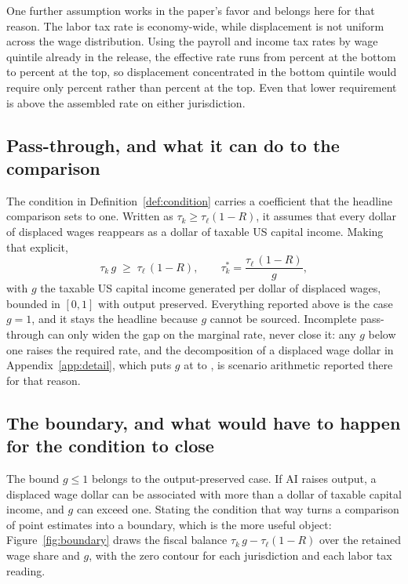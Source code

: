 One further assumption works in the paper's favor and belongs here for that reason. The labor
tax rate is economy-wide, while displacement is not uniform across the wage distribution. Using
the payroll and income tax rates by wage quintile already in the release, the effective rate runs
from  percent at the bottom to  percent
at the top, so displacement concentrated in the bottom quintile would require only
 percent rather than  percent at the
top. Even that lower requirement is above the assembled rate on either jurisdiction.

\subsection{Pass-through, and what it can do to the comparison}

The condition in Definition~\ref{def:condition} carries a coefficient that the headline comparison
sets to one. Written as $\tau_k \ge \tau_\ell (1 - R)$, it assumes that every dollar of displaced
wages reappears as a dollar of taxable US capital income. Making that explicit,
\begin{equation}
\tau_k \, g \;\ge\; \tau_\ell\,(1 - R), \qquad
\tau_k^{\ast} = \frac{\tau_\ell\,(1 - R)}{g},
\label{eq:passthrough}
\end{equation}
with $g$ the taxable US capital income generated per dollar of displaced wages, bounded in
$[0,1]$ with output preserved. Everything reported above is the case $g = 1$, and it stays the
headline because $g$ cannot be sourced. Incomplete pass-through can only widen the gap on the
marginal rate, never close it: any $g$ below one raises the required rate, and the decomposition of a displaced
wage dollar in Appendix~\ref{app:detail}, which puts $g$ at  to , is
scenario arithmetic reported there for that reason.

\subsection{The boundary, and what would have to happen for the condition to close}

The bound $g \le 1$ belongs to the output-preserved case. If AI raises output, a displaced wage
dollar can be associated with more than a dollar of taxable capital income, and $g$ can exceed
one. Stating the condition that way turns a comparison of point estimates into a boundary, which
is the more useful object: Figure~\ref{fig:boundary} draws the fiscal balance
$\tau_k \, g - \tau_\ell (1 - R)$ over the retained wage share and $g$, with the zero contour for
each jurisdiction and each labor tax reading.


